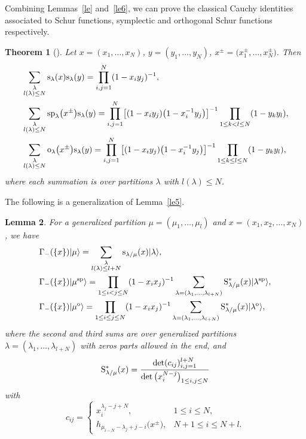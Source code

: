 \documentclass[10pt,a4paper]{amsart}
\numberwithin{equation}{section}
\newtheorem{Theorem}{Theorem}[section]
\newtheorem{Lemma}[Theorem]{Lemma}
\begin{document}
Combining Lemmas~\ref{le} and~\ref{le6}, we can prove the classical Cauchy identities associated to Schur functions, symplectic and orthogonal Schur functions respectively.
\begin{Theorem}[\cite{Be2018,KT1987,Su1990}]%
Let $x=(x_1,\dots,x_N)$, $y=(y_1,\dots,y_N)$, $x^{\pm}=\big(x^{\pm}_1,\dots,x^{\pm}_N\big)$. Then
\begin{align*}
&\sum_{\substack{\lambda\\l(\lambda)\leq N}}{\rm s}_\lambda(x){\rm s}_\lambda(y)=\prod^{N}_{i,j=1}(1-x_iy_j)^{-1},\\%
&\sum_{\substack{\lambda\\l(\lambda)\leq N}}{\rm sp}_\lambda\big(x^{\pm}\big){\rm s}_\lambda(y)=\prod^{N}_{i,j=1}\bigl[(1-x_iy_j)\big(1-x^{-1}_iy_j\big)\bigr]^{-1}\prod_{1\leq k< l\leq N}(1-y_ky_l),\\%
&\sum_{\substack{\lambda\\l(\lambda)\leq N}}{\rm o}_\lambda\big(x^{\pm}\big){\rm s}_\lambda(y)=\prod^{N}_{i,j=1}\big[(1-x_iy_j)\big(1-x^{-1}_iy_j\big)\big]^{-1}\prod_{1\leq k\leq l\leq N}(1-y_ky_l),%
\end{align*}
where each summation is over partitions $\lambda$ with $l(\lambda)\leq N$.
\end{Theorem}
The following is a generalization of Lemma~\ref{le5}.
\begin{Lemma}For a generalized partition $\mu=(\mu_1,\dots,\mu_l)$ and $x=(x_1,x_2,\dots,x_N)$, we have
\begin{align}
\label{e:sc19}&\Gamma_-(\{x\})|\mu\rangle=\sum_{\substack{\lambda\\l(\lambda)\leq l+N}}{\rm s}_{\lambda/\mu}(x)|\lambda\rangle,\\
\label{e:sp20}&\Gamma_-(\{x\})|\mu^{\rm sp}\rangle=\prod_{1\leq i<j\leq N}(1-x_ix_j)^{-1}\sum_{\lambda=(\lambda_1,\dots,\lambda_{l+N})}{\rm S}^*_{\lambda/\mu}(x)|\lambda^{\rm sp}\rangle,\\
&\Gamma_-(\{x\})|\mu^{\rm o}\rangle=\prod_{1\leq i\leq j\leq N}(1-x_ix_j)^{-1}\sum_{\lambda=(\lambda_1,\dots,\lambda_{l+N})}{\rm S}^*_{\lambda/\mu}(x)|\lambda^{\rm o}\rangle,\nonumber%
\end{align}
where the second and third sums are over generalized partitions $\lambda=(\lambda_1,\dots,\lambda_{l+N})$ with zeros parts allowed in the end, and
\begin{align*}
{\rm S}^*_{\lambda/\mu}(x)=\frac{\det(c_{ij})^{l+N}_{i,j=1}}{\det\big(x^{N-j}_i\big)_{1\leq i,j\leq N}}
\end{align*}
with
\[
c_{ij}=\begin{cases}
x^{\lambda_j-j+N}_i, &1\leq i\leq N,\\
h_{\mu_{i-N}-\lambda_j+j-i}\big(x^{\pm}\big), & N+1\leq i\leq N+l.
\end{cases}
\]
\end{Lemma}
\end{document}
